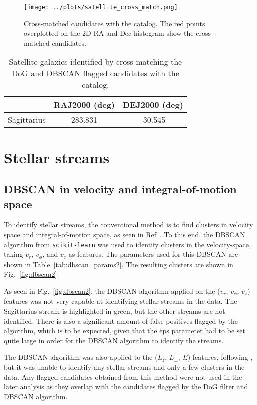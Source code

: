 \documentclass[11pt,a4paper]{article}
\begin{document}
\begin{figure}[h]
    \centering
    \texttt{[image: ../plots/satellite\_cross\_match.png]}
    \caption{Cross-matched candidates with the \citeauthor{2020ApJ...893...47D} catalog. The red points overplotted on the 2D RA and Dec histogram show the cross-matched candidates.}
    \label{fig:satellite_crossmatch}
\end{figure}

\begin{table}[h]
    \centering
    \begin{tabular}{c|c|c}
        & RAJ2000 (deg) & DEJ2000 (deg) \\
        \hline
        Sagittarius & 283.831 & -30.545        
    \end{tabular}
    \caption{Satellite galaxies identified by cross-matching the DoG and DBSCAN flagged candidates with the \citeauthor{2020ApJ...893...47D} catalog.} 
    \label{tab:drlica_wagner}
\end{table}
\clearpage
\section{Stellar streams}
\label{sec:streams}
\subsection{DBSCAN in velocity and integral-of-motion space}
To identify stellar streams, the conventional method is to find clusters in velocity space and integral-of-motion space, as seen in Ref~\citep[e.g.][]{10.1093/mnras/stz3479, Koppelman_2018}. To this end, the DBSCAN algorithm from \texttt{scikit-learn} \citep{scikit-learn} was used to identify clusters in the velocity-space, taking $v_r$, $v_\phi$, and $v_z$ as features. The parameters used for this DBSCAN are shown in Table~\ref{tab:dbscan_params2}. The resulting clusters are shown in Fig.~\ref{fig:dbscan2}.

As seen in Fig.~\ref{fig:dbscan2}, the DBSCAN algorithm applied on the ($v_r$, $v_\phi$, $v_z$) features was not very capable at identifying stellar streams in the data. The Sagittarius stream is highlighted in green, but the other streams are not identified. There is also a significant amount of false positives flagged by the algorithm, which is to be expected, given that the $\mathrm{eps}$ parameter had to be set quite large in order for the DBSCAN algorithm to identify the streams.

The DBSCAN algorithm was also applied to the ($L_z$, $L_\bot$, $E$) features, following \citeauthor{10.1093/mnras/stz3479}, but it was unable to identify any stellar streams and only a few clusters in the data. Any flagged candidates obtained from this method were not used in the later analysis as they overlap with the candidates flagged by the DoG filter and DBSCAN algorithm.
\end{document}

